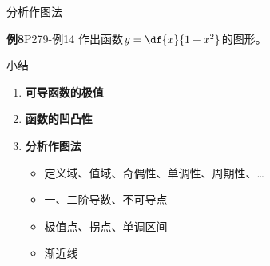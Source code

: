 \begin{frame}[t]{分析作图法}
	\linespread{1.2}
	\begin{exampleblock}{{\bf 例8}\hfill P279-例14}
		作出函数$y=\df{x}{1+x^2}$的图形。
	\end{exampleblock}
	\begin{center}
		\end{center}
\end{frame}

\begin{frame}[<+->]{小结}
	\linespread{1.5}
	\begin{enumerate}
	  \item {\bf 可导函数的极值}
	  \item {\bf 函数的凹凸性}
	  \item {\bf 分析作图法}
	  \begin{itemize}
	    \item 定义域、值域、奇偶性、单调性、周期性、\ldots
	    \item 一、二阶导数、不可导点
	    \item 极值点、拐点、单调区间
	    \item 渐近线
	  \end{itemize}
	\end{enumerate}
\end{frame}

